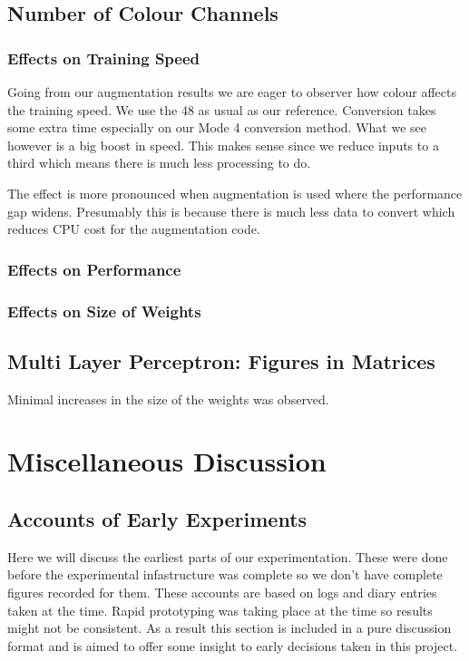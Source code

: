 \subsection{Number of Colour Channels}
\subsubsection{Effects on Training Speed}
Going from our augmentation results we are eager to observer how colour affects the training speed. We use the 48 as usual as our reference. Conversion takes some extra time especially on our Mode 4 conversion method. What we see however is a big boost in speed. This makes sense since we reduce inputs to a third which means there is much less processing to do.

The effect is more pronounced when augmentation is used where the performance gap widens. Presumably this is because there is much less data to convert which reduces CPU cost for the augmentation code.
\subsubsection{Effects on Performance}
\subsubsection{Effects on Size of Weights}

\subsection{Multi Layer Perceptron: Figures in Matrices}
Minimal increases in the size of the weights was observed. 

\section{Miscellaneous Discussion}
\subsection{Accounts of Early Experiments}
Here we will discuss the earliest parts of our experimentation. These were done before the experimental infastructure was complete so we don't have complete figures recorded for them. These accounts are based on logs and diary entries taken at the time. Rapid prototyping was taking place at the time so results might not be consistent. As a result this section is included in a pure discussion format and is aimed to offer some insight to early decisions taken in this project.

